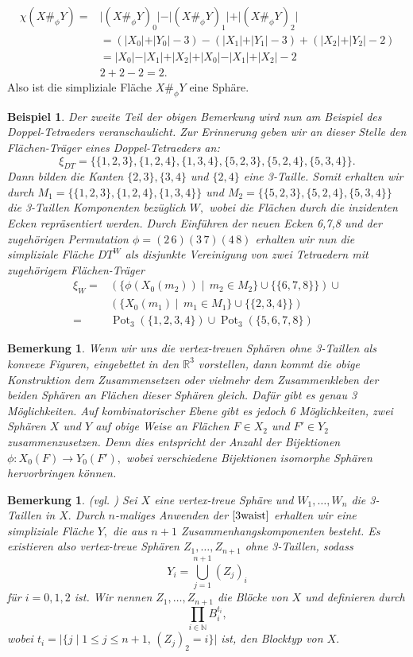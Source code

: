 \documentclass[12pt,titlepage,twoside,cleardoublepage]{article}
\theoremstyle{nummermitklammern}
\newtheorem{bsp}[temp]{Beispiel}
\newtheorem{bemerkung}[temp]{Bemerkung}
\newtheorem{bsp}[zahl]{Beispiel}
\newtheorem{bemerkung}[zahl]{Bemerkung}
\numberwithin{equation}{section}
\DeclareMathOperator{\Pot}{Pot}
\begin{document}
\begin{align*}
\chi(X\#_\phi Y)=&\vert(X\#_\phi Y)_0\vert -\vert (X\#_\phi Y)_1\vert +\vert (X\#_\phi Y)_2\vert\\
&=(\vert X_0\vert+\vert Y_0\vert-3)-(\vert X_1\vert+\vert Y_1\vert-3)+(\vert X_2\vert+\vert Y_2\vert-2)\\ 
&=\vert X_0\vert-\vert X_1\vert+\vert X_2\vert+\vert X_0\vert-\vert X_1\vert+\vert X_2\vert-2\\
&2+2-2=2.
\end{align*}
Also ist die simpliziale Fläche $X\#_\phi Y$ eine Sphäre. 
\begin{bsp}
Der zweite Teil der obigen Bemerkung wird nun am Beispiel des Doppel-Tetraeders veranschaulicht.
Zur Erinnerung geben wir an dieser Stelle den Flächen-Träger eines Doppel-Tetraeders an:
\[
\xi_{DT}=\{\{1,2,3\},\{1,2,4\},\{1,3,4\},\{5,2,3\},\{5,2,4\},\{5,3,4\}\}.
\]
Dann bilden die Kanten $\{2,3\},\{3,4\}$ und $\{2,4\}$ eine 3-Taille. Somit erhalten wir durch $M_1=\{\{1,2,3\},\{1,2,4\},\{1,3,4\}\}$ und $M_2=\{\{5,2,3\},\{5,2,4\},\{5,3,4\}\}$ die 3-Taillen Komponenten bezüglich $W,$ wobei die Flächen durch die inzidenten Ecken repräsentiert werden. Durch Einführen der neuen Ecken 6,7,8 und der zugehörigen Permutation $\phi=(2\, 6)(3\, 7)(4\,8)$ erhalten wir nun die simpliziale Fläche $DT^W$ als disjunkte Vereinigung von zwei Tetraedern mit zugehörigem Flächen-Träger
\begin{align*}
\xi_W=&(\{\phi(X_0(m_2))\mid \, m_2\in M_2\}\cup \{\{6,7,8\}\}) \cup \\
&(\{X_0(m_1)\mid \, m_1\in M_1\}\cup \{\{2,3,4\}\})\\
=&\Pot_3(\{1,2,3,4\})\cup \Pot_3(\{5,6,7,8\})
\end{align*}
\end{bsp}
\begin{bemerkung}
Wenn wir uns die vertex-treuen Sphären ohne 3-Taillen als konvexe Figuren, eingebettet in den $\mathbb{R}^3$ vorstellen, dann kommt die obige Konstruktion dem Zusammensetzen oder vielmehr dem Zusammenkleben der beiden Sphären an Flächen dieser Sphären gleich. Dafür gibt es genau 3 Möglichkeiten. Auf kombinatorischer Ebene gibt es jedoch 6 Möglichkeiten, zwei Sphären $X$ und $Y$ auf obige Weise an 
Flächen $F\in X_2$ und $F'\in Y_2$ zusammenzusetzen. Denn dies entspricht der Anzahl der Bijektionen $\phi:X_0(F)\to Y_0(F'),$ wobei verschiedene Bijektionen isomorphe Sphären hervorbringen können.
\end{bemerkung}
\begin{bemerkung}{\textsc{(}vgl. \textsc{\cite{simp})}}
Sei $X$ eine vertex-treue Sphäre und $W_1,\ldots,W_n$ die 3-Taillen in $X.$ Durch  $n$-maliges Anwenden der $\Cref{3waist}$ erhalten wir eine simpliziale Fläche $Y,$ die aus $n+1$ Zusammenhangskomponenten besteht. Es existieren also vertex-treue Sphären $Z_1,\ldots,Z_{n+1}$ ohne 3-Taillen, sodass
\[
Y_i=\bigcup_{j=1}^{n+1}(Z_j)_i 
\]
für $i=0,1,2$ ist. Wir nennen $Z_1,\ldots,Z_{n+1}$ die \emph{Blöcke} von $X$ und definieren durch 
\[
\prod_{i\in \mathbb{N}} B_i^{t_i},
\]
wobei $t_i=\vert\{j \mid 1\leq j\leq n+1,\,(Z_j)_2=i\}\vert$ ist, den \emph{Blocktyp} von $X.$
\end{bemerkung}
\end{document}

